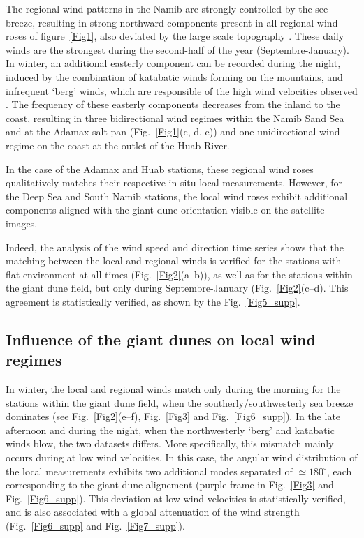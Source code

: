   The regional wind patterns in the Namib are strongly controlled by the see breeze, resulting in strong northward components present in all regional wind roses of figure~\ref{Fig1}, also deviated by the large scale topography \citep{lancaster1985}. These daily winds are the strongest during the second-half of the year (Septembre-January). In winter, an additional easterly component can be recorded during the night, induced by the combination of katabatic winds forming on the mountains, and infrequent `berg' winds, which are responsible of the high wind velocities observed \citep{lancaster1984}. The frequency of these easterly components decreases from the inland to the coast, resulting in three bidirectional wind regimes within the Namib Sand Sea and at the Adamax salt pan (Fig.~\ref{Fig1}(c, d, e)) and one unidirectional wind regime on the coast at the outlet of the Huab River.

  In the case of the Adamax and Huab stations, these regional wind roses qualitatively matches their respective in situ local measurements. However, for the Deep Sea and South Namib stations, the local wind roses exhibit additional components aligned with the giant dune orientation visible on the satellite images.

  Indeed, the analysis of the wind speed and direction time series shows that the matching between the local and regional winds is verified for the stations with flat environment at all times (Fig.~\ref{Fig2}(a--b)), as well as for the stations within the giant dune field, but only during Septembre-January (Fig.~\ref{Fig2}(c--d). This agreement is statistically verified, as shown by the Fig.~\ref{Fig5_supp}.

  \subsection{Influence of the giant dunes on local wind regimes}

  In winter, the local and regional winds match only during the morning for the stations within the giant dune field, when the southerly/southwesterly sea breeze dominates (see Fig.~\ref{Fig2}(e--f), Fig.~\ref{Fig3} and Fig.~\ref{Fig6_supp}). In the late afternoon and during the night, when the northwesterly `berg' and katabatic winds blow, the two datasets differs. More specifically, this mismatch mainly occurs during at low wind velocities. In this case, the angular wind distribution of the local measurements exhibits two additional modes separated of $\simeq 180^\circ$, each corresponding to the giant dune alignement (purple frame in Fig.~\ref{Fig3} and Fig.~\ref{Fig6_supp}). This deviation at low wind velocities is statistically verified, and is also associated with a global attenuation of the wind strength (Fig.~\ref{Fig6_supp} and Fig.~\ref{Fig7_supp}).

